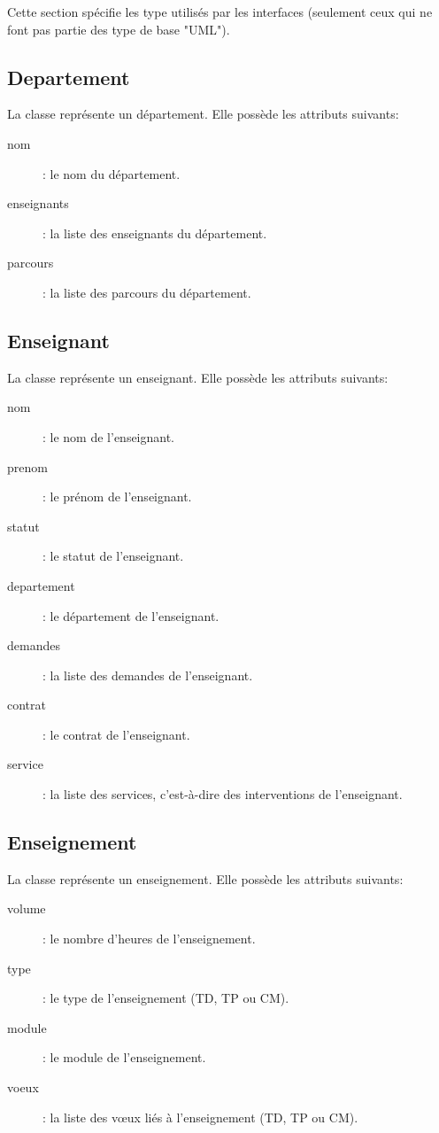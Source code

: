     Cette section spécifie les type utilisés par les interfaces (seulement ceux qui ne font pas partie des type de base "UML").  
    
    \subsection{Departement}
    	La classe  représente un département. Elle possède les attributs suivants:
    	\begin{description}
    		\item[nom]: le nom du département. 
    		\item[enseignants]: la liste des enseignants du département.  
    		\item[parcours]: la liste des parcours du département.
    	\end{description}
        
    \subsection{Enseignant}
    	La classe  représente un enseignant. Elle possède les attributs suivants:
    	\begin{description}
    		\item[nom]: le nom de l'enseignant. 
    		\item[prenom]: le prénom de l'enseignant.  
    		\item[statut]: le statut de l'enseignant.
    		\item[departement]: le département de l'enseignant. 
    		\item[demandes]: la liste des demandes de l'enseignant. 
    		\item[contrat]: le contrat de l'enseignant.
    		\item[service]: la liste des services, c'est-à-dire des interventions de l'enseignant.
    	\end{description}

    \subsection{Enseignement}
    	La classe  représente un enseignement. Elle possède les attributs suivants:
    	\begin{description}
    		\item[volume]: le nombre d'heures de l'enseignement. 
    		\item[type]: le type de l'enseignement (TD, TP ou CM). 
    		\item[module]: le module de l'enseignement. 
    		\item[voeux]: la liste des v\oe{}ux liés à l'enseignement (TD, TP ou CM).
    	\end{description}


